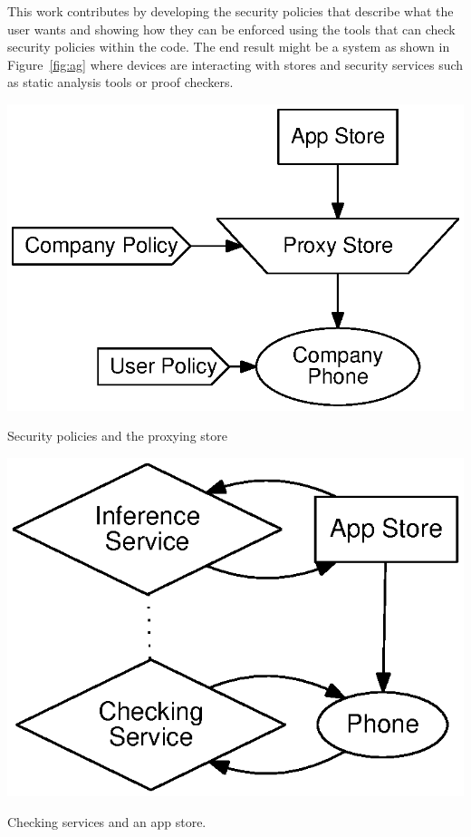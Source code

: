 \documentclass[a4paper]{article}
\begin{document}
This work contributes by developing the security policies that describe what the
user wants and showing how they can be enforced using the tools that can check
security policies within the code.  The end result might be a system as shown in
Figure~\ref{fig:ag} where devices are interacting with stores and security
services such as static analysis tools or proof checkers. 

\begin{marginfigure}
  \includegraphics[width=\marginlength]{img/proxystore.eps}
  \caption{Security policies and the proxying store}
  \label{fig:proxy}
\end{marginfigure}

\begin{marginfigure}
  \includegraphics[width=\marginlength]{img/digitalevidence.eps}
  \caption{Checking services and an app store.}
  \label{fig:de}
\end{marginfigure}
\end{document}
